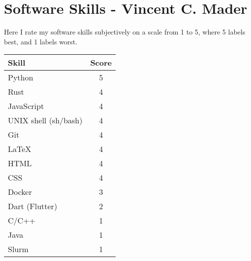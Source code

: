 \documentclass[11 pt]{article}
\begin{document}
    \section*{Software Skills - Vincent C. Mader}

    Here I rate my software skills subjectively on a scale from 1 to 5, where 5 labels best, and 1 labels worst.

    \begin{table}[h!]
        \begin{center}
        \begin{tabular}{lc}
            Skill & Score \\
            \hline
            Python & 5 \\
            Rust & 4 \\
            JavaScript & 4 \\
            UNIX shell (sh/bash) & 4 \\
            Git & 4 \\
            LaTeX & 4 \\
            HTML & 4 \\
            CSS & 4 \\
            Docker & 3 \\
            Dart (Flutter) & 2 \\
            C/C++ & 1 \\
            Java & 1 \\
            Slurm & 1 
        \end{tabular}
        \end{center}
    \end{table}
\end{document}
